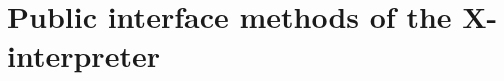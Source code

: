 \section{Public interface methods of the X-interpreter}
\label{apx:xinterpreter}

\begin{figure}[H]

\end{figure}
